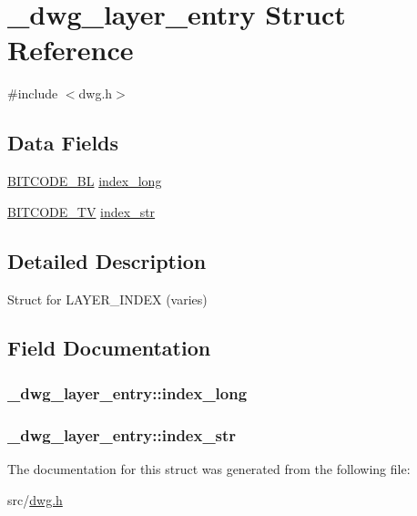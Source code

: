 \hypertarget{struct__dwg__layer__entry}{\section{\-\_\-dwg\-\_\-layer\-\_\-entry \-Struct \-Reference}
\label{struct__dwg__layer__entry}
}


{\ttfamily \#include $<$dwg.\-h$>$}

\subsection*{\-Data \-Fields}
\begin{DoxyCompactItemize}
\item 
\hyperlink{dwg_8h_aebd5f127038868cbabc3d55d91da776c}{\-B\-I\-T\-C\-O\-D\-E\-\_\-\-B\-L} \hyperlink{struct__dwg__layer__entry_a690cb008d1e06d349034ed4c1df26ea1}{index\-\_\-long}
\item 
\hyperlink{dwg_8h_a2a7e040c6e36ca039b03608679ecaf7c}{\-B\-I\-T\-C\-O\-D\-E\-\_\-\-T\-V} \hyperlink{struct__dwg__layer__entry_a6a55e170d88043f4d457f779c238e6ac}{index\-\_\-str}
\end{DoxyCompactItemize}


\subsection{\-Detailed \-Description}
\-Struct for \-L\-A\-Y\-E\-R\-\_\-\-I\-N\-D\-E\-X (varies) 

\subsection{\-Field \-Documentation}
\hypertarget{struct__dwg__layer__entry_a690cb008d1e06d349034ed4c1df26ea1}{
\subsubsection[{index\-\_\-long}]{ {\bf \-\_\-dwg\-\_\-layer\-\_\-entry\-::index\-\_\-long}}}\label{struct__dwg__layer__entry_a690cb008d1e06d349034ed4c1df26ea1}
\hypertarget{struct__dwg__layer__entry_a6a55e170d88043f4d457f779c238e6ac}{
\subsubsection[{index\-\_\-str}]{ {\bf \-\_\-dwg\-\_\-layer\-\_\-entry\-::index\-\_\-str}}}\label{struct__dwg__layer__entry_a6a55e170d88043f4d457f779c238e6ac}


\-The documentation for this struct was generated from the following file\-:\begin{DoxyCompactItemize}
\item 
src/\hyperlink{dwg_8h}{dwg.\-h}\end{DoxyCompactItemize}
